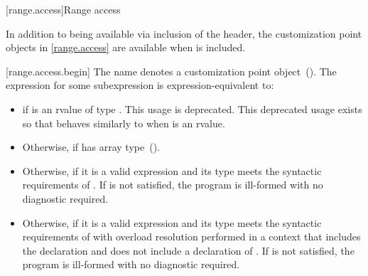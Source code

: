 {

[range.access]{Range access}

{\color{oldclr}
\pnum
In addition to being available via inclusion of the 
header, the customization point objects in \ref{range.access} are
available when  is included.
} %


[range.access.begin]{}
\pnum
The name  denotes a customization point
 object~(). The expression
 for some subexpression  is expression-equivalent to:

\begin{itemize}
\item
   if  is an rvalue of
  type . This usage is deprecated.
  \enternote This deprecated usage exists so that
   behaves similarly to 
   when  is an rvalue. \exitnote

\item
  Otherwise,  if  has array
  type~().

\item
  Otherwise,  if it is a valid expression and its type  meets the
  syntactic requirements of . If
   is not satisfied, the program is ill-formed
  with no diagnostic required.

\item
  Otherwise,  if it is a valid expression and its type  meets the
  syntactic requirements of  with overload
  resolution performed in a context that includes the declaration
   and does not include
  a declaration of . If 
  is not satisfied, the program is ill-formed with no diagnostic
  required.


\end{itemize}}
